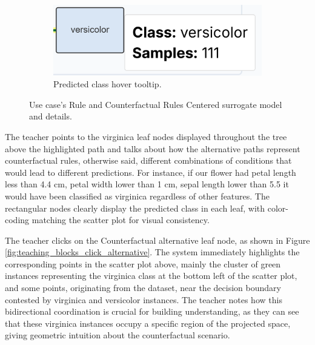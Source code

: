 \begin{figure}
\begin{subfigure}[c]{0.33\textwidth}
        \vfill
        \includegraphics[width=\textwidth]{images/teaching_blocks_prediction_tooltip.png}
        \caption{Predicted class hover tooltip.}
        \label{fig:teaching_blocks_prediction_tooltip}
    \end{subfigure}
    \caption{Use case's Rule and Counterfactual Rules Centered surrogate model and details.}
\end{figure}

The teacher points to the virginica leaf nodes displayed throughout the tree above the highlighted path and talks about how the alternative paths represent counterfactual rules, otherwise said, different combinations of conditions that would lead to different predictions. For instance, if our flower had petal length less than 4.4 cm, petal width lower than 1 cm, sepal length lower than 5.5 it would have been classified as virginica regardless of other features. The rectangular nodes clearly display the predicted class in each leaf, with color-coding matching the scatter plot for visual consistency.

The teacher clicks on the Counterfactual alternative leaf node, as shown in Figure \ref{fig:teaching_blocks_click_alternative}. The system immediately highlights the corresponding points in the scatter plot above, mainly the cluster of green instances representing the virginica class at the bottom left of the scatter plot, and some points, originating from the dataset, near the decision boundary contested by virginica and versicolor instances. The teacher notes how this bidirectional coordination is crucial for building understanding, as they can see that these virginica instances occupy a specific region of the projected space, giving geometric intuition about the counterfactual scenario. 



